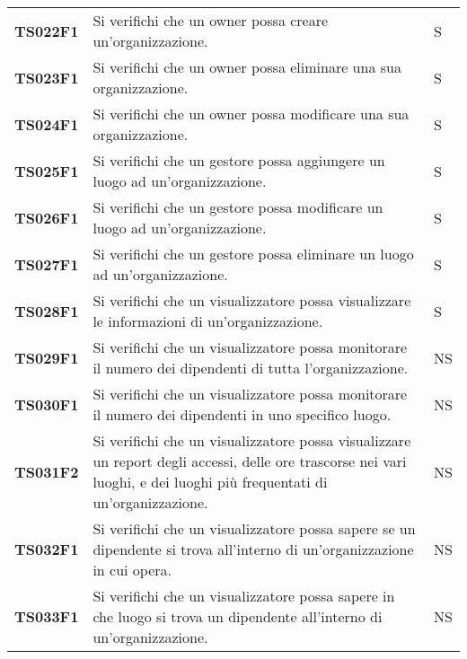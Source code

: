\documentclass[../../piano-di-qualifica.tex]{subfiles}
\begin{document}
\begin{longtable}[H]{>{\centering\bfseries}m{3cm} >{}m{10cm} >{\centering\arraybackslash}m{3cm}}
  TS022F1            & Si verifichi che un owner possa creare un'organizzazione. 
  & S               \\

  TS023F1            & Si verifichi che un owner possa eliminare una sua organizzazione. 
  & S               \\

  TS024F1            & Si verifichi che un owner possa modificare una sua organizzazione. 
  & S               \\
  
  TS025F1            & Si verifichi che un gestore possa aggiungere un luogo ad un'organizzazione. 
  & S               \\

  TS026F1            & Si verifichi che un gestore possa modificare un luogo ad un'organizzazione. 
  & S               \\

  TS027F1            & Si verifichi che un gestore possa eliminare un luogo ad un'organizzazione. 
  & S               \\

  TS028F1            & Si verifichi che un visualizzatore possa visualizzare le informazioni di un'organizzazione. 
  & S               \\

  TS029F1            & Si verifichi che un visualizzatore possa monitorare il numero dei dipendenti di tutta l'organizzazione.
  & NS               \\

  TS030F1            & Si verifichi che un visualizzatore possa monitorare il numero dei dipendenti in uno specifico luogo.
  & NS               \\

  TS031F2            & Si verifichi che un visualizzatore possa visualizzare un report degli accessi, delle ore trascorse nei vari luoghi, e dei luoghi più frequentati di un'organizzazione.
  & NS               \\

  TS032F1            & Si verifichi che un visualizzatore possa sapere se un dipendente si trova all’interno di un’organizzazione in cui opera.
  & NS               \\

  TS033F1            & Si verifichi che un visualizzatore possa sapere in che luogo si trova un dipendente all'interno di un'organizzazione.
  & NS               \\


\end{longtable}
\end{document}

